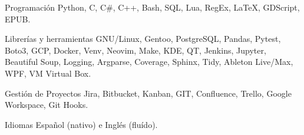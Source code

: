 

\begin{cvskills}

  \cvskill
    {Programación} %
    {Python, C, C\#, C++, Bash, SQL, Lua, RegEx, LaTeX, GDScript, EPUB.} %

  \cvskill
    {Librerías y herramientas}
    {GNU/Linux, Gentoo, PostgreSQL, Pandas, Pytest, Boto3, GCP, Docker, Venv, Neovim, Make, KDE, QT, Jenkins,}
  \cvskill
    {}
    {Jupyter, Beautiful Soup, Logging, Argparse, Coverage, Sphinx, Tidy, Ableton Live/Max, WPF, VM Virtual Box.}

  \cvskill
    {Gestión de Proyectos}
    {Jira, Bitbucket, Kanban, GIT, Confluence, Trello, Google Workspace, Git Hooks.}

  \cvskill
    {Idiomas}
    {Español (nativo) e Inglés (fluído).}


\end{cvskills}
